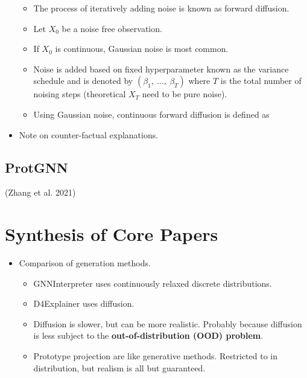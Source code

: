 \documentclass[
  11pt,
  letterpaper,
]{article}
\providecommand{\tightlist}{%
  \setlength{\itemsep}{0pt}\setlength{\parskip}{0pt}}\usepackage{longtable,booktabs,array}
\begin{document}
\begin{itemize}
  \begin{itemize}
  \tightlist
  \item
    The process of iteratively adding noise is known as forward
    diffusion.
  \item
    Let \(X_0\) be a noise free observation.\\
  \item
    If \(X_0\) is continuous, Gaussian noise is most common.
  \item
    Noise is added based on fixed hyperparameter known as the variance
    schedule and is denoted by \((\beta_1, \ \dots, \ \beta_T)\) where
    \(T\) is the total number of noising steps (theoretical \(X_T\) need
    to be pure noise).
  \item
    Using Gaussian noise, continuous forward diffusion is defined as
  \end{itemize}
\item
  Note on counter-factual explanations.
\end{itemize}

\hypertarget{protgnn}{%
\subsection{ProtGNN}\label{protgnn}}

(Zhang et al. 2021)

\hypertarget{synthesis-of-core-papers}{%
\section{Synthesis of Core Papers}\label{synthesis-of-core-papers}}

\begin{itemize}
\tightlist
\item
  Comparison of generation methods.

  \begin{itemize}
  \tightlist
  \item
    GNNInterpreter uses continuously relaxed discrete distributions.
  \item
    D4Explainer uses diffusion.
  \item
    Diffusion is slower, but can be more realistic. Probably because
    diffusion is less subject to the \textbf{out-of-distribution (OOD)
    problem}.
  \item
    Prototype projection are like generative methods. Restricted to in
    distribution, but realism is all but guaranteed.
  \end{itemize}
\end{itemize}
\end{document}

